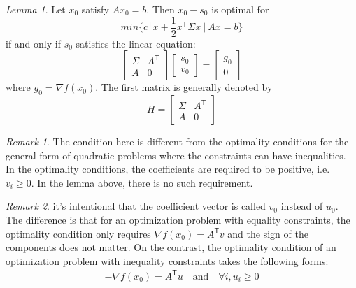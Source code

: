 \documentclass[letterpaper, oneside]{book}
\theoremstyle{definition}
\theoremstyle{remark}
\newtheorem*{remark}{Remark}
\newtheorem{lemma}[theorem]{Lemma}
\begin{document}
\begin{lemma}\label{lemma_search_direction}
	Let $x_0$ satisfy $Ax_0 = b$. Then $x_0 - s_0$ is optimal for
	\[
	min\{ c^{\mathsf{T}}x + \frac{1}{2} x^{\mathsf{T}}\Sigma{}x \ |\ Ax = b \}
	\] 
	if and only if $s_0$ satisfies the linear equation:
	\begin{displaymath}
		\begin{bmatrix}
			\Sigma{} & A^{\mathsf{T}} \\
			A & 0
		\end{bmatrix}		
		\begin{bmatrix}
			s_0\\
			v_0
		\end{bmatrix}
		= 
		\begin{bmatrix}
			g_0 \\
			0
		\end{bmatrix}
	\end{displaymath}
	where $g_0 = \nabla{}f(x_0)$. The first matrix is generally denoted by
	\begin{displaymath}
		H = \begin{bmatrix}
			\Sigma{} & A^{\mathsf{T}} \\
			A & 0
		\end{bmatrix}
	\end{displaymath}
\end{lemma}

\begin{remark}
	The condition here is different from the optimality conditions for the general form of quadratic problems where the constraints can have inequalities. In the optimality conditions, the coefficients are required to be positive, i.e. $v_i \ge 0$. In the lemma above, there is no such requirement.
\end{remark}

\begin{remark}\label{remark_flipped_sign}
	it's intentional that the coefficient vector is called $v_0$ instead of $u_0$. The difference is that for an optimization problem with equality constraints, the optimality condition only requires $\nabla f(x_0)  = A^{\mathsf{T}} v$ and the sign of the components does not matter. On the contrast, the optimality condition of an optimization problem with inequality constraints takes the following forms:
	\begin{align*}
		-\nabla f(x_0) = A^{\mathsf{T}} u \quad \mathrm{and} \quad \forall i, u_i \geqslant 0
	\end{align*}
\end{remark}
\end{document}
